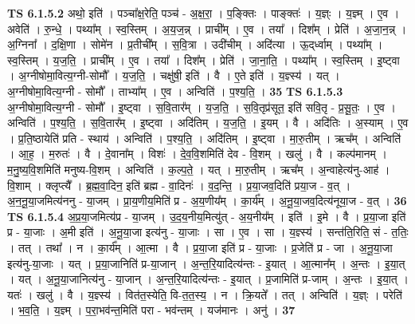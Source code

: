 \documentclass[17pt]{extarticle}
\begin{document}
                  \newline
                                \textbf{ TS 6.1.5.2} \newline
                  अथो॒ इति॑ । पञ्चा᳚क्ष॒रेति॒ पञ्च॑ - अ॒क्ष॒रा॒ । प॒ङ्क्तिः । पाङ्क्तः॑ । य॒ज्ञ्ः । य॒ज्ञ्म् । ए॒व । अवेति॑ । रु॒न्धे॒ । पथ्या᳚म् । स्व॒स्तिम् । अ॒य॒ज॒न्न् । प्राची᳚म् । ए॒व । तया᳚ । दिश᳚म् । प्रेति॑ । अ॒जा॒न॒न्न् । अ॒ग्निना᳚ । द॒क्षि॒णा । सोमे॑न । प्र॒तीची᳚म् । स॒वि॒त्रा । उदी॑चीम् । अदि॑त्या । ऊ॒द्‌र्ध्वाम् । पथ्या᳚म् । स्व॒स्तिम् । य॒ज॒ति॒ । प्राची᳚म् । ए॒व । तया᳚ । दिश᳚म् । प्रेति॑ । जा॒ना॒ति॒ । पथ्या᳚म् । स्व॒स्तिम् । इ॒ष्ट्वा । अ॒ग्नीषोमा॒वित्य॒ग्नी-सोमौ᳚ । य॒ज॒ति॒ । चक्षु॑षी॒ इति॑ । वै । ए॒ते इति॑ । य॒ज्ञ्स्य॑ । यत् । अ॒ग्नीषोमा॒वित्य॒ग्नी - सोमौ᳚ । ताभ्या᳚म् । ए॒व । अन्विति॑ । प॒श्य॒ति॒ । \textbf{  35} \newline
                  \newline
                                \textbf{ TS 6.1.5.3} \newline
                  अ॒ग्नीषोमा॒वित्य॒ग्नी - सोमौ᳚ । इ॒ष्ट्वा । स॒वि॒तार᳚म् । य॒ज॒ति॒ । स॒वि॒तृप्र॑सूत॒ इति॑ सवि॒तृ - प्र॒सू॒तः॒ । ए॒व । अन्विति॑ । प॒श्य॒ति॒ । स॒वि॒तार᳚म् । इ॒ष्ट्वा । अदि॑तिम् । य॒ज॒ति॒ । इ॒यम् । वै । अदि॑तिः । अ॒स्याम् । ए॒व । प्र॒ति॒ष्ठायेति॑ प्रति - स्थाय॑ । अन्विति॑ । प॒श्य॒ति॒ । अदि॑तिम् । इ॒ष्ट्वा । मा॒रु॒तीम् । ऋच᳚म् । अन्विति॑ । आ॒ह॒ । म॒रुतः॑ । वै । दे॒वाना᳚म् । विशः॑ । दे॒व॒वि॒शमिति॑ देव - वि॒शम् । खलु॑ । वै । कल्प॑मानम् । म॒नु॒ष्य॒वि॒शमिति॑ मनुष्य-वि॒शम् । अन्विति॑ । क॒ल्प॒ते॒ । यत् । मा॒रु॒तीम् । ऋच᳚म् । अ॒न्वाहेत्य॑नु-आह॑ । वि॒शाम् । क्लृप्त्यै᳚ । ब्र॒ह्म॒वा॒दिन॒ इति॑ ब्रह्म - वा॒दिनः॑ । व॒द॒न्ति॒ । प्र॒या॒जव॒दिति॑ प्रया॒ज - व॒त् । अ॒न॒नू॒या॒जमित्य॑ननु - या॒जम् । प्रा॒य॒णीय॒मिति॑ प्र - अ॒य॒णीय᳚म् । का॒र्य᳚म् । अ॒नू॒या॒जव॒दित्य॑नूया॒ज - व॒त् । \textbf{  36} \newline
                  \newline
                                \textbf{ TS 6.1.5.4} \newline
                  अ॒प्र॒या॒जमित्य॑प्र - या॒जम् । उ॒द॒य॒नीय॒मित्यु॑त् - अ॒य॒नीय᳚म् । इति॑ । इ॒मे । वै । प्र॒या॒जा इति॑ प्र - या॒जाः । अ॒मी इति॑ । अ॒नू॒या॒जा इत्य॑नु - या॒जाः । सा । ए॒व । सा । य॒ज्ञ्स्य॑ । सन्त॑ति॒रिति॒ सं - त॒तिः॒ । तत् । तथा᳚ । न । का॒र्य᳚म् । आ॒त्मा । वै । प्र॒या॒जा इति॑ प्र - या॒जाः । प्र॒जेति॑ प्र - जा । अ॒नू॒या॒जा इत्य॑नु-या॒जाः । यत् । प्र॒या॒जानिति॑ प्र-या॒जान् । अ॒न्त॒रि॒यादित्य॑न्तः - इ॒यात् । आ॒त्मान᳚म् । अ॒न्तः । इ॒या॒त् । यत् । अ॒नू॒या॒जानित्य॑नु - या॒जान् । अ॒न्त॒रि॒यादित्य॑न्तः - इ॒यात् । प्र॒जामिति॑ प्र-जाम् । अ॒न्तः । इ॒या॒त् । यतः॑ । खलु॑ । वै । य॒ज्ञ्स्य॑ । वित॑त॒स्येति॒ वि-त॒त॒स्य॒ । न । क्रि॒यते᳚ । तत् । अन्विति॑ । य॒ज्ञ्ः । परेति॑ । भ॒व॒ति॒ । य॒ज्ञ्म् । प॒रा॒भव॑न्त॒मिति॑ परा - भव॑न्तम् । यज॑मानः । अनु॑ । \textbf{  37} \newline
\end{document}
